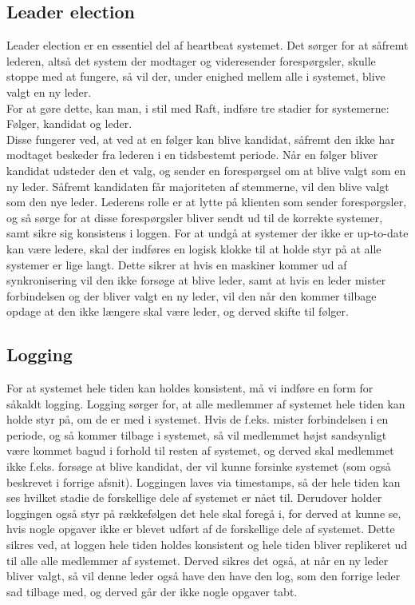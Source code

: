 \documentclass[a4paper,12pt]{article}
\begin{document}
\subsection*{Leader election}
Leader election er en essentiel del af heartbeat systemet. Det sørger for at såfremt lederen, altså det system der modtager og videresender forespørgsler, skulle stoppe med at fungere, så vil der, under enighed mellem alle i systemet, blive valgt en ny leder.
\\
For at gøre dette, kan man, i stil med Raft, indføre tre stadier for systemerne:
\\ 
Følger, kandidat og leder.
\\
Disse fungerer ved, at ved at en følger kan blive kandidat, såfremt den ikke har modtaget beskeder fra lederen i en tidsbestemt periode. Når en følger bliver kandidat udsteder den et valg, og sender en forespørgsel om at blive valgt som en ny leder. Såfremt kandidaten får majoriteten af stemmerne, vil den blive valgt som den nye leder. Lederens rolle er at lytte på klienten som sender forespørgsler, og så sørge for at disse forespørgsler bliver sendt ud til de korrekte systemer, samt sikre sig konsistens i loggen. For at undgå at systemer der ikke er up-to-date kan være ledere, skal der indføres en logisk klokke til at holde styr på at alle systemer er lige langt. Dette sikrer at hvis en maskiner kommer ud af synkronisering vil den ikke forsøge at blive leder, samt at hvis en leder mister forbindelsen og der bliver valgt en ny leder, vil den når den kommer tilbage opdage at den ikke længere skal være leder, og derved skifte til følger. 


\subsection*{Logging}
For at systemet hele tiden kan holdes konsistent, må vi indføre en form for såkaldt logging. Logging sørger for, at alle medlemmer af systemet hele tiden kan holde styr på, om de er med i systemet. Hvis de f.eks. mister forbindelsen i en periode, og så kommer tilbage i systemet, så vil medlemmet højst sandsynligt være kommet bagud i forhold til resten af systemet, og derved skal medlemmet ikke f.eks. forsøge at blive kandidat, der vil kunne forsinke systemet (som også beskrevet i forrige afsnit). Loggingen laves via timestamps, så der hele tiden kan ses hvilket stadie de forskellige dele af systemet er nået til. Derudover holder loggingen også styr på rækkefølgen det hele skal foregå i, for derved at kunne se, hvis nogle opgaver ikke er blevet udført af de forskellige dele af systemet. Dette sikres ved, at loggen hele tiden holdes konsistent og hele tiden bliver replikeret ud til alle alle medlemmer af systemet. Derved sikres det også, at når en ny leder bliver valgt, så vil denne leder også have den have den log, som den forrige leder sad tilbage med, og derved går der ikke nogle opgaver tabt.
\end{document}
